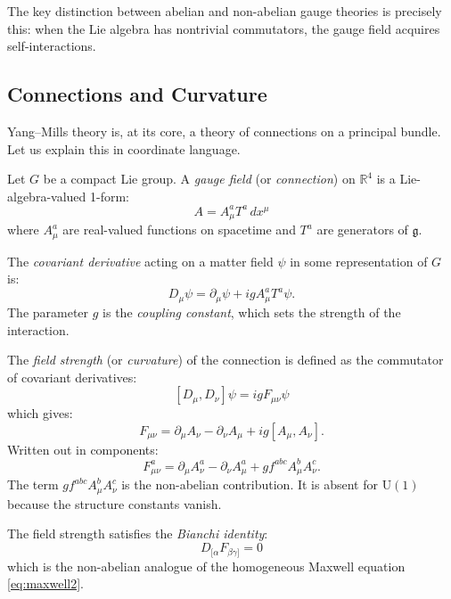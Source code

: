The key distinction between abelian and non-abelian gauge theories is precisely this: when the Lie algebra has nontrivial commutators, the gauge field acquires self-interactions.

\subsection{Connections and Curvature}

Yang--Mills theory is, at its core, a theory of connections on a principal bundle. Let us explain this in coordinate language.

Let $G$ be a compact Lie group. A \textit{gauge field} (or \textit{connection}) on $\mathbb{R}^4$ is a Lie-algebra-valued 1-form:
\[
A = A_\mu^a T^a \, dx^\mu
\]
where $A_\mu^a$ are real-valued functions on spacetime and $T^a$ are generators of $\mathfrak{g}$.

The \textit{covariant derivative} acting on a matter field $\psi$ in some representation of $G$ is:
\[
D_\mu \psi = \partial_\mu \psi + ig A_\mu^a T^a \psi.
\]
The parameter $g$ is the \textit{coupling constant}, which sets the strength of the interaction.

The \textit{field strength} (or \textit{curvature}) of the connection is defined as the commutator of covariant derivatives:
\[
[D_\mu, D_\nu] \psi = ig F_{\mu\nu} \psi
\]
which gives:
\[
F_{\mu\nu} = \partial_\mu A_\nu - \partial_\nu A_\mu + ig [A_\mu, A_\nu].
\]
Written out in components:
\[
F_{\mu\nu}^a = \partial_\mu A_\nu^a - \partial_\nu A_\mu^a + g f^{abc} A_\mu^b A_\nu^c.
\]
The term $gf^{abc} A_\mu^b A_\nu^c$ is the non-abelian contribution. It is absent for $\mathrm{U}(1)$ because the structure constants vanish.

The field strength satisfies the \textit{Bianchi identity}:
\[
D_{[\alpha} F_{\beta\gamma]} = 0
\]
which is the non-abelian analogue of the homogeneous Maxwell equation \eqref{eq:maxwell2}.

